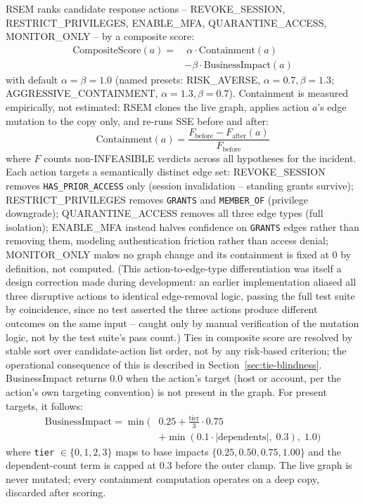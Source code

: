 \documentclass[conference]{IEEEtran}
\begin{document}
RSEM ranks candidate response actions -- REVOKE\_SESSION, RESTRICT\_PRIVILEGES, ENABLE\_MFA, QUARANTINE\_ACCESS, MONITOR\_ONLY -- by a composite score:
\begin{align*}
\text{CompositeScore}(a) =&~ \alpha \cdot \text{Containment}(a) \\
&- \beta \cdot \text{BusinessImpact}(a)
\end{align*}
with default $\alpha = \beta = 1.0$ (named presets: RISK\_AVERSE, $\alpha{=}0.7,\beta{=}1.3$; AGGRESSIVE\_CONTAINMENT, $\alpha{=}1.3,\beta{=}0.7$). Containment is measured empirically, not estimated: RSEM clones the live graph, applies action $a$'s edge mutation to the copy only, and re-runs SSE before and after:
$$\text{Containment}(a) = \frac{F_{\text{before}} - F_{\text{after}}(a)}{F_{\text{before}}}$$
where $F$ counts non-INFEASIBLE verdicts across all hypotheses for the incident. Each action targets a semantically distinct edge set: REVOKE\_SESSION removes \texttt{HAS\_PRIOR\_ACCESS} only (session invalidation -- standing grants survive); RESTRICT\_PRIVILEGES removes \texttt{GRANTS} and \texttt{MEMBER\_OF} (privilege downgrade); QUARANTINE\_ACCESS removes all three edge types (full isolation); ENABLE\_MFA instead halves confidence on \texttt{GRANTS} edges rather than removing them, modeling authentication friction rather than access denial; MONITOR\_ONLY makes no graph change and its containment is fixed at 0 by definition, not computed. (This action-to-edge-type differentiation was itself a design correction made during development: an earlier implementation aliased all three disruptive actions to identical edge-removal logic, passing the full test suite by coincidence, since no test asserted the three actions produce different outcomes on the same input -- caught only by manual verification of the mutation logic, not by the test suite's pass count.) Ties in composite score are resolved by stable sort over candidate-action list order, not by any risk-based criterion; the operational consequence of this is described in Section~\ref{sec:tie-blindness}. BusinessImpact returns 0.0 when the action's target (host or account, per the action's own targeting convention) is not present in the graph. For present targets, it follows:
\begin{align*}
\text{BusinessImpact} = \min\!\Big(&0.25 + \tfrac{\text{tier}}{3}\cdot 0.75 \\
&+ \min(0.1 \cdot |\text{dependents}|,\; 0.3),\; 1.0\Big)
\end{align*}
where \texttt{tier} $\in \{0,1,2,3\}$ maps to base impacts $\{0.25, 0.50, 0.75, 1.00\}$ and the dependent-count term is capped at 0.3 before the outer clamp. The live graph is never mutated; every containment computation operates on a deep copy, discarded after scoring.
\end{document}
